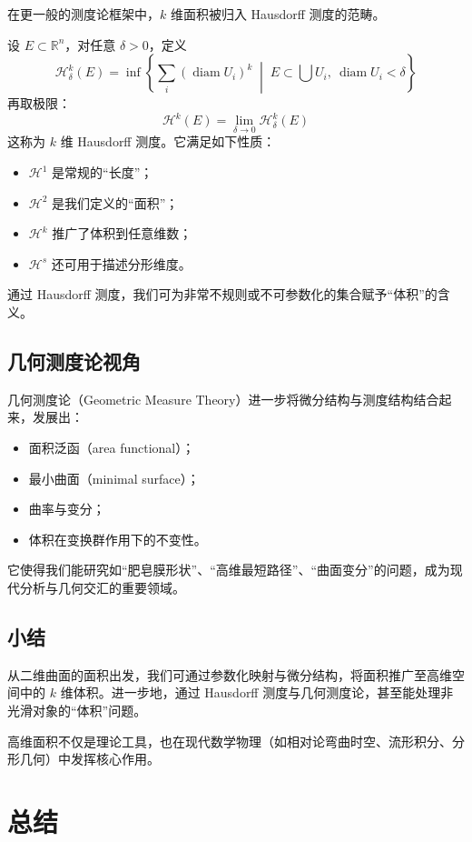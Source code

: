 \documentclass[a4paper, oneside]{article}
\begin{document}
在更一般的测度论框架中，$k$ 维面积被归入 Hausdorff 测度的范畴。

设 $E \subset \mathbb{R}^n$，对任意 $\delta > 0$，定义
\[
\mathcal{H}^k_\delta(E) = \inf\left\{ \sum_{i} (\operatorname{diam} U_i)^k \;\middle|\; E \subset \bigcup U_i,\ \operatorname{diam} U_i < \delta \right\}
\]
再取极限：
\[
\mathcal{H}^k(E) = \lim_{\delta \to 0} \mathcal{H}^k_\delta(E)
\]
这称为 $k$ 维 Hausdorff 测度。它满足如下性质：
\begin{itemize}
    \item $\mathcal{H}^1$ 是常规的“长度”；
    \item $\mathcal{H}^2$ 是我们定义的“面积”；
    \item $\mathcal{H}^k$ 推广了体积到任意维数；
    \item $\mathcal{H}^s$ 还可用于描述分形维度。
\end{itemize}

通过 Hausdorff 测度，我们可为非常不规则或不可参数化的集合赋予“体积”的含义。

\subsection{几何测度论视角}

几何测度论（Geometric Measure Theory）进一步将微分结构与测度结构结合起来，发展出：
\begin{itemize}
    \item 面积泛函（area functional）；
    \item 最小曲面（minimal surface）；
    \item 曲率与变分；
    \item 体积在变换群作用下的不变性。
\end{itemize}

它使得我们能研究如“肥皂膜形状”、“高维最短路径”、“曲面变分”的问题，成为现代分析与几何交汇的重要领域。

\subsection{小结}

从二维曲面的面积出发，我们可通过参数化映射与微分结构，将面积推广至高维空间中的 $k$ 维体积。进一步地，通过 Hausdorff 测度与几何测度论，甚至能处理非光滑对象的“体积”问题。

高维面积不仅是理论工具，也在现代数学物理（如相对论弯曲时空、流形积分、分形几何）中发挥核心作用。

\section{总结}
\end{document}
